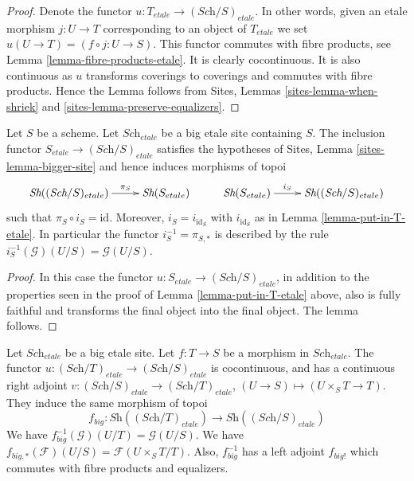 \begin{proof}
Denote the functor $u : T_{etale} \to (\textit{Sch}/S)_{etale}$.
In other words, given an etale morphism $j : U \to T$ corresponding
to an object of $T_{etale}$ we set $u(U \to T) = (f \circ j : U \to S)$.
This functor commutes with fibre products, see
Lemma \ref{lemma-fibre-products-etale}.
It is clearly cocontinuous.
It is also continuous as $u$ transforms coverings to coverings and
commutes with fibre products. Hence the Lemma follows from
Sites, Lemmas \ref{sites-lemma-when-shriek}
and \ref{sites-lemma-preserve-equalizers}.
\end{proof}

\begin{lemma}
\label{lemma-at-the-bottom-etale}
Let $S$ be a scheme. Let $\textit{Sch}_{etale}$ be a big etale
site containing $S$.
The inclusion functor $S_{etale} \to (\textit{Sch}/S)_{etale}$
satisfies the hypotheses of Sites, Lemma \ref{sites-lemma-bigger-site}
and hence induces morphisms of topoi
$$
\xymatrix{
\textit{Sh}((\textit{Sch}/S)_{etale}) \ar[r]^-{\pi_S} &
\textit{Sh}(S_{etale}) &
\textit{Sh}(S_{etale}) \ar[r]^-{i_S} &
\textit{Sh}((\textit{Sch}/S)_{etale})
}
$$
such that $\pi_S \circ i_S = \text{id}$. Moreover, $i_S = i_{\text{id}_S}$
with $i_{\text{id}_S}$ as in Lemma \ref{lemma-put-in-T-etale}.
In particular the functor $i_S^{-1} = \pi_{S, *}$ is described by the rule
$i_S^{-1}(\mathcal{G})(U/S) = \mathcal{G}(U/S)$.
\end{lemma}

\begin{proof}
In this case the functor $u : S_{etale} \to (\textit{Sch}/S)_{etale}$,
in addition to the properties seen in the proof of
Lemma \ref{lemma-put-in-T-etale} above, also is fully faithful
and transforms the final object into the final object.
The lemma follows.
\end{proof}

\begin{lemma}
\label{lemma-morphism-big-etale}
Let $\textit{Sch}_{etale}$ be a big etale site.
Let $f : T \to S$ be a morphism in $\textit{Sch}_{etale}$.
The functor $u : (\textit{Sch}/T)_{etale} \to (\textit{Sch}/S)_{etale}$
is cocontinuous, and has a continuous right adjoint
$v : (\textit{Sch}/S)_{etale} \to (\textit{Sch}/T)_{etale}$,
$(U \to S) \mapsto (U \times_S T \to T)$. They induce the same morphism
of topoi
$$
f_{big} :
\textit{Sh}((\textit{Sch}/T)_{etale})
\longrightarrow
\textit{Sh}((\textit{Sch}/S)_{etale})
$$
We have $f_{big}^{-1}(\mathcal{G})(U/T) = \mathcal{G}(U/S)$.
We have $f_{big, *}(\mathcal{F})(U/S) = \mathcal{F}(U\times_ST/T)$.
Also, $f_{big}^{-1}$ has a left adjoint $f_{big!}$ which commutes with
fibre products and equalizers.
\end{lemma}

